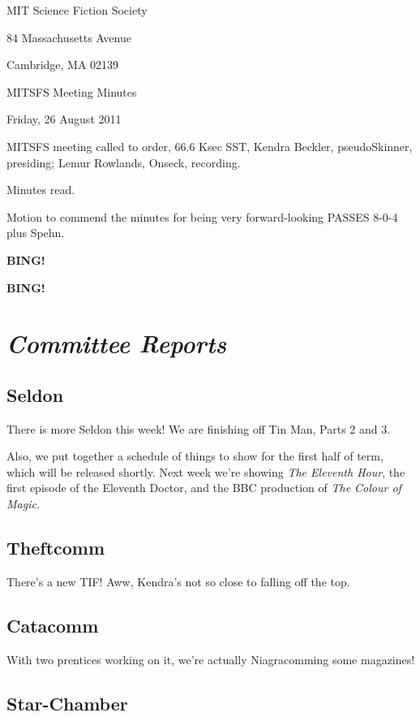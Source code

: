 \documentclass[10pt]{article}
\newcommand{\bing}{{\bf BING!} }
\newcommand{\goto}[1]{\bing \vskip 12pt \section*{{\em{#1}}}}
\newcommand{\ps}{ plus Spehn\xspace}
\newcommand{\skinner}{Kendra Beckler, pseudoSkinner}
\newcommand{\onseck}{Lemur Rowlands, Onseck}
\newcommand{\meetingdate}{Friday, 26 August 2011}
\begin{document}
\begin{center}

MIT Science Fiction Society

84 Massachusetts Avenue

Cambridge, MA 02139

\vspace{12pt}

MITSFS Meeting Minutes

\meetingdate

\end{center}

\vspace{18pt}

\setlength{\parskip}{6pt}

\noindent
MITSFS meeting called to order, 66.6 Ksec SST,
\skinner, presiding; \onseck, recording.

Minutes read.

Motion to commend the minutes for being very forward-looking PASSES 8-0-4\ps.

\bing

\goto{Committee Reports}

\subsection*{Seldon}

There is more Seldon this week!  We are finishing off Tin Man, Parts 2 and 3.

Also, we put together a schedule of things to show for the first half of term,
which will be released shortly.  Next week we're showing \emph{The Eleventh Hour},
the first episode of the Eleventh Doctor, and the BBC production of \emph{The
Colour of Magic}.

\subsection*{Theftcomm}

There's a new TIF!  Aww, Kendra's not so close to falling off the top.

\subsection*{Catacomm}

With two prentices working on it, we're actually Niagracomming some magazines!

\subsection*{Star-Chamber}
\end{document}
